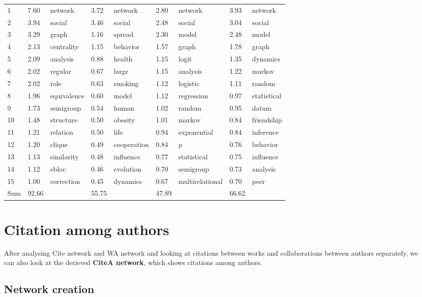 \documentclass[11pt]{article} %
\begin{document}
\begin{center}
\begin{table}
\begin{tabular}{p{0.7cm}|p{1cm}|p{2cm}||p{1cm}|p{2cm}||p{1cm}|p{2.1cm}||p{1cm}|p{1.7cm}}
1&	7.60&	network&	3.72&	network&	2.80&	network&	3.93&	network\\
2&	3.94&	social&	3.46&	social&	2.48&	social&	3.04&	social\\
3&	3.29&	graph&	1.16&	spread&	2.30&	model&	2.48&	model\\
4&	2.13&	centrality&	1.15&	behavior&	1.57&	graph&	1.78&	graph\\
5&	2.09&	analysis&	0.88&	health&	1.15&	logit&	1.35&	dynamics\\
6&	2.02&	regular&	0.67&	large&	1.15&	analysis&	1.22&	markov\\
7&	2.02&	role&	0.63&	smoking&	1.12&	logistic&	1.11&	random\\
8&	1.96&	equivalence&	0.60&	model&	1.12&	regression&	0.97&	statistical\\
9&	1.73&	semigroup&	0.54&	human&	1.02&	random&	0.95&	datum\\
10&	1.48&	structure&	0.50&	obesity&	1.01&	markov&	0.84&	friendship\\
11&	1.21&	relation&	0.50&	life&	0.94&	exponential&	0.84&	inference\\
12&	1.20&	clique&	0.49&	cooperation&	0.84&	p&	0.76&	behavior\\
13&	1.13&	similarity&	0.48&	influence&	0.77&	statistical&	0.75&	influence\\
14&	1.12&	ebloc&	0.46&	evolution&	0.70&	semigroup&	0.73&	analysis\\
15&	1.00&	correction&	0.45&	dynamics&	0.67&	multirelational&	0.70&	peer\\ \hline
Sum&	92.66&	&	55.75&	&	47.89&	&	66.62&	\\
\end{tabular}
\end{table}
\end{center}


\section{Citation among authors}

After analysing Cite network and WA network and looking at citations between works and collaborations between authors separately, we can also look at the derieved \textbf{CiteA network}, which shows citations among authors. \medskip 

\subsection{Network creation} 
\end{document}
